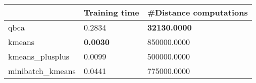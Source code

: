 \begin{table}[htbp]
\centering
\begin{tabular}{lll}
\toprule
 & Training time & #Distance computations \\
\midrule
qbca & 0.2834 & \textbf{32130.0000} \\
kmeans & \textbf{0.0030} & 850000.0000 \\
kmeans_plusplus & 0.0099 & 500000.0000 \\
minibatch_kmeans & 0.0441 & 775000.0000 \\
\bottomrule
\end{tabular}
\end{table}

